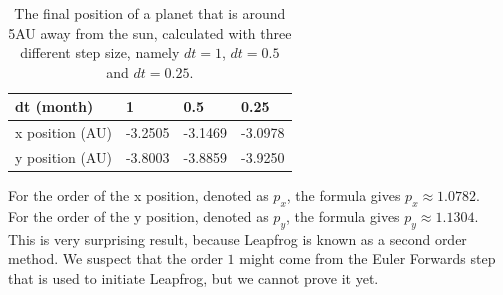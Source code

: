 \begin{table}[htb]
\centering
\caption{The final position of a planet that is around 5AU away from the sun, calculated with three different step size, namely $dt=1$, $dt=0.5$ and $dt=0.25$.}
\begin{tabular}{|l|l|l|l|}
\hline
dt (month)&1&0.5&0.25\\ \hline
x position (AU)&-3.2505&   -3.1469&   -3.0978\\ \hline
y position (AU)&   -3.8003&   -3.8859&   -3.9250\\ \hline
\end{tabular}
\label{tab:Richardson5AU}
\end{table}

For the order of the x position, denoted as $p_x$, the formula gives $p_x\approx 1.0782$.\\
For the order of the y position, denoted as $p_y$, the formula gives $p_y\approx 1.1304$.\\ 

This is very surprising result, because Leapfrog is known as a second order method. 
We suspect that the order $1$ might come from the Euler Forwards step that is used to initiate Leapfrog, but we cannot prove it yet.
